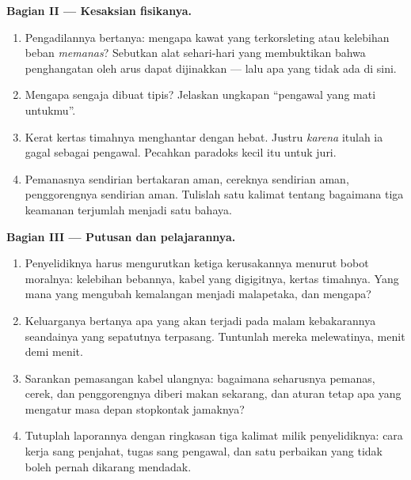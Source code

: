 \begin{problem}
\medskip\noindent\textbf{Bagian II --- Kesaksian fisikanya.}
\begin{enumerate}[resume]
  \item Pengadilannya bertanya: mengapa kawat yang terkorsleting atau
        kelebihan beban \emph{memanas}? Sebutkan alat sehari-hari yang
        membuktikan bahwa penghangatan oleh arus dapat dijinakkan ---
        lalu apa yang tidak ada di sini.
  \item Mengapa  sengaja dibuat tipis? Jelaskan ungkapan
        ``pengawal yang mati untukmu''.
  \item Kerat kertas timahnya menghantar dengan hebat. Justru
        \emph{karena} itulah ia gagal sebagai pengawal. Pecahkan
        paradoks kecil itu untuk juri.
  \item Pemanasnya sendirian bertakaran aman, cereknya sendirian
        aman, penggorengnya sendirian aman. Tulislah satu kalimat
        tentang bagaimana tiga keamanan terjumlah menjadi satu bahaya.
\end{enumerate}

\medskip\noindent\textbf{Bagian III --- Putusan dan
pelajarannya.}
\begin{enumerate}[resume]
  \item Penyelidiknya harus mengurutkan ketiga kerusakannya menurut
        bobot moralnya: kelebihan bebannya, kabel yang digigitnya,
        kertas timahnya. Yang mana yang mengubah kemalangan menjadi
        malapetaka, dan mengapa?
  \item Keluarganya bertanya apa yang akan terjadi pada malam
        kebakarannya seandainya  yang sepatutnya terpasang.
        Tuntunlah mereka melewatinya, menit demi menit.
  \item Sarankan pemasangan kabel ulangnya: bagaimana seharusnya
        pemanas, cerek, dan penggorengnya diberi makan sekarang, dan
        aturan tetap apa yang mengatur masa depan stopkontak jamaknya?
  \item Tutuplah laporannya dengan ringkasan tiga kalimat milik
        penyelidiknya: cara kerja sang penjahat, tugas sang pengawal,
        dan satu perbaikan yang tidak boleh pernah dikarang mendadak.
\end{enumerate}
\end{problem}
